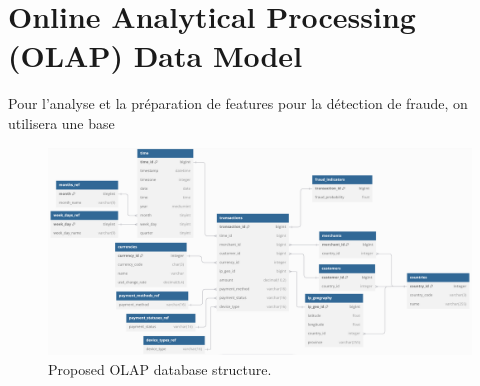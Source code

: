 \documentclass[11pt,a4paper,computermodern]{article}
\begin{document}
\section*{Online Analytical Processing (OLAP) Data Model}

Pour l'analyse et la préparation de features pour la détection de fraude, on utilisera une base 


\begin{figure}
	\centering
	\includegraphics[scale=0.56]{./figures/OLAP}
	\caption{Proposed OLAP database structure.}
	\label{fig:OLAP}
\end{figure}
\end{document}
